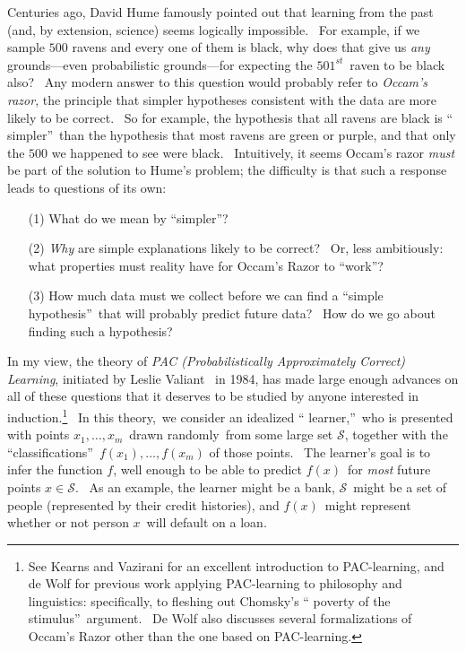 \documentclass[11pt,onecolumn]{article}%
\begin{document}
Centuries ago, David Hume \cite{hume} famously pointed out that learning from
the past (and, by extension, science) seems logically impossible. \ For
example, if we sample $500$ ravens and every one of them is black, why does
that give us \textit{any} grounds---even probabilistic grounds---for expecting
the $501^{st}$\ raven to be black also? \ Any modern answer to this question
would probably refer to \textit{Occam's razor}, the principle that simpler
hypotheses consistent with the data are more likely to be correct. \ So for
example, the hypothesis that all ravens are black is \textquotedblleft
simpler\textquotedblright\ than the hypothesis that most ravens are green or
purple, and that only the $500$ we happened to see were black. \ Intuitively,
it seems Occam's razor \textit{must} be part of the solution to Hume's
problem; the difficulty is that such a response leads to questions of its own:

\begin{enumerate}
\item[(1)] What do we mean by \textquotedblleft simpler\textquotedblright?

\item[(2)] \textit{Why} are simple explanations likely to be correct? \ Or,
less ambitiously: what properties must reality have for Occam's Razor to
\textquotedblleft work\textquotedblright?

\item[(3)] How much data must we collect before we can find a
\textquotedblleft simple hypothesis\textquotedblright\ that will probably
predict future data? \ How do we go about finding such a hypothesis?
\end{enumerate}

In my view, the theory of \textit{PAC (Probabilistically Approximately
Correct) Learning}, initiated by Leslie Valiant \cite{valiant:pac}\ in 1984,
has made large enough advances on all of these questions that it deserves to
be studied by anyone interested in induction.\footnote{See Kearns and Vazirani
\cite{kvaz} for an excellent introduction to PAC-learning, and de Wolf
\cite{dewolf:masters} for previous work applying PAC-learning to philosophy
and linguistics: specifically, to fleshing out Chomsky's \textquotedblleft
poverty of the stimulus\textquotedblright\ argument. \ De Wolf also discusses
several formalizations of Occam's Razor other than the one based on
PAC-learning.} \ In this theory,\ we consider an idealized \textquotedblleft
learner,\textquotedblright\ who is presented with points $x_{1},\ldots,x_{m}%
$\ drawn randomly\ from some large set $\mathcal{S}$, together with the
\textquotedblleft classifications\textquotedblright\ $f\left(  x_{1}\right)
,\ldots,f\left(  x_{m}\right)  $ of those points. \ The learner's goal is to
infer the function $f$, well enough to be able to predict $f\left(  x\right)
$\ for \textit{most} future points $x\in\mathcal{S}$. \ As an example, the
learner might be a bank, $\mathcal{S}$\ might be a set of people (represented
by their credit histories), and $f\left(  x\right)  $\ might represent whether
or not person $x$\ will default on a loan.
\end{document}
